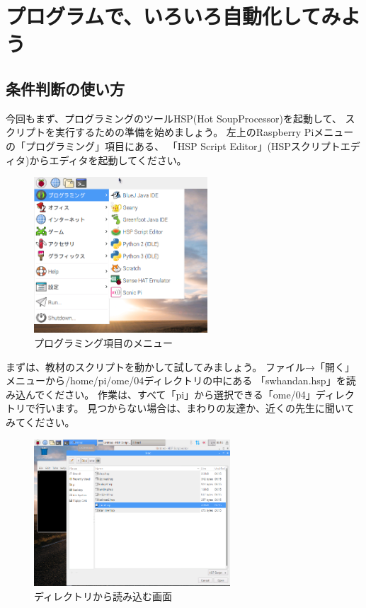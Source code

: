 \chapter{プログラムで、いろいろ自動化してみよう}
\section{条件判断の使い方}

今回もまず、プログラミングのツールHSP(Hot SoupProcessor)を起動して、
スクリプトを実行するための準備を始めましょう。
左上のRaspberry Piメニューの「プログラミング」項目にある、
「HSP Script Editor」(HSPスクリプトエディタ)からエディタを起動してください。

\begin{figure}[H]
  \begin{center}
    \includegraphics[width=6.489cm,height=5.826cm]{images/chap04/text04-img001.png}
    \caption{プログラミング項目のメニュー}
  \end{center}
\end{figure}

まずは、教材のスクリプトを動かして試してみましょう。
ファイル→「開く」メニューから/home/pi/ome/04ディレクトリの中にある
「swhandan.hsp」を読み込んでください。
作業は、すべて「pi」から選択できる「ome/04」ディレクトリで行います。
見つからない場合は、まわりの友達か、近くの先生に聞いてみてください。

\begin{figure}[H]
  \begin{center}
    \includegraphics[width=7.338cm,height=5.493cm]{images/chap04/text04-img002.png}
    \caption{ディレクトリから読み込む画面}
  \end{center}
  \label{fig:read_from_directory}
\end{figure}

\clearpage

